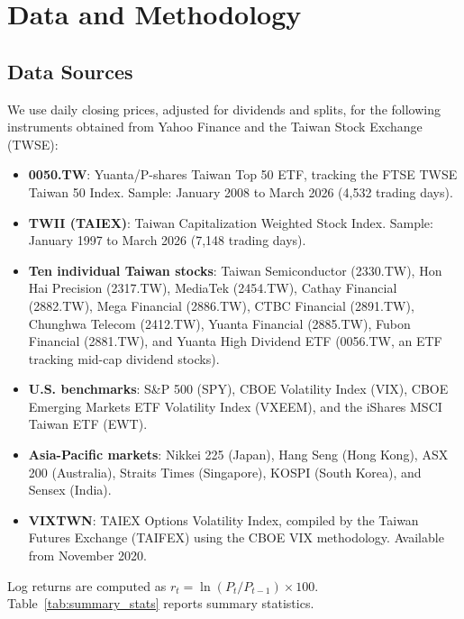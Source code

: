 
\section{Data and Methodology}
\label{sec:data}

\subsection{Data Sources}

We use daily closing prices, adjusted for dividends and splits, for the following instruments obtained from Yahoo Finance and the Taiwan Stock Exchange (TWSE):

\begin{itemize}
    \item \textbf{0050.TW}: Yuanta/P-shares Taiwan Top 50 ETF, tracking the FTSE TWSE Taiwan 50 Index. Sample: January 2008 to March 2026 (4,532 trading days).
    \item \textbf{TWII (TAIEX)}: Taiwan Capitalization Weighted Stock Index. Sample: January 1997 to March 2026 (7,148 trading days).
    \item \textbf{Ten individual Taiwan stocks}: Taiwan Semiconductor (2330.TW), Hon Hai Precision (2317.TW), MediaTek (2454.TW), Cathay Financial (2882.TW), Mega Financial (2886.TW), CTBC Financial (2891.TW), Chunghwa Telecom (2412.TW), Yuanta Financial (2885.TW), Fubon Financial (2881.TW), and Yuanta High Dividend ETF (0056.TW, an ETF tracking mid-cap dividend stocks).
    \item \textbf{U.S. benchmarks}: S\&P 500 (SPY), CBOE Volatility Index (VIX), CBOE Emerging Markets ETF Volatility Index (VXEEM), and the iShares MSCI Taiwan ETF (EWT).
    \item \textbf{Asia-Pacific markets}: Nikkei 225 (Japan), Hang Seng (Hong Kong), ASX 200 (Australia), Straits Times (Singapore), KOSPI (South Korea), and Sensex (India).
    \item \textbf{VIXTWN}: TAIEX Options Volatility Index, compiled by the Taiwan Futures Exchange (TAIFEX) using the CBOE VIX methodology. Available from November 2020.
\end{itemize}

Log returns are computed as $r_t = \ln(P_t / P_{t-1}) \times 100$. Table~\ref{tab:summary_stats} reports summary statistics.

